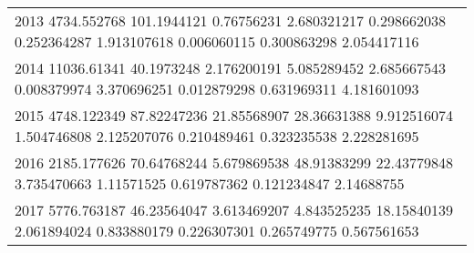 \documentclass[]{article}
\begin{document}
\begin{table}[ht]
\begin{tabular}{l}
  2013  4734.552768 101.1944121 0.76756231  2.680321217 0.298662038 0.252364287 1.913107618 0.006060115 0.300863298 2.054417116 \\ 
  2014  11036.61341 40.1973248  2.176200191 5.085289452 2.685667543 0.008379974 3.370696251 0.012879298 0.631969311 4.181601093 \\ 
  2015  4748.122349 87.82247236 21.85568907 28.36631388 9.912516074 1.504746808 2.125207076 0.210489461 0.323235538 2.228281695 \\ 
  2016  2185.177626 70.64768244 5.679869538 48.91383299 22.43779848 3.735470663 1.11571525  0.619787362 0.121234847 2.14688755 \\ 
  2017  5776.763187 46.23564047 3.613469207 4.843525235 18.15840139 2.061894024 0.833880179 0.226307301 0.265749775 0.567561653 \\ 
   \hline
\end{tabular}
\end{table}




\newpage
\singlespacing 
\end{document}
